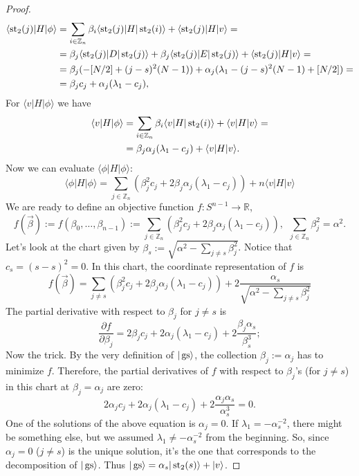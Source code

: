 \begin{proof}
\[\begin{split}
\langle \st_2(j) |H|\phi\rangle& = \sum_{i \in \mathbb Z_n}\beta_i\langle \st_2(j) |H|\st_2(i)\rangle + \langle \st_2(j) | H | v \rangle = \\& = \beta_j \langle \st_2(j) | D|\st_2(j)\rangle + \beta_j \langle \st_2(j)|E|\st_2(j)\rangle + \langle \st_2(j) |H|v \rangle = \\ &= \beta_j(-[N/2] + (j-s)^2(N-1)) +  \alpha_j(\lambda_1 - (j-s)^2(N-1) + [N/2]) = \\ &= \beta_jc_j + \alpha_j(\lambda_1-c_j), %
\end{split}
\]
For $\langle v | H |\phi \rangle$ we have
\[\begin{split}
\langle v | H | \phi \rangle& = \sum_{i \in \mathbb Z_n}\beta_i\langle v | H|\operatorname{st}_2(i)\rangle + \langle v |H|v \rangle = \\ &= \beta_j\alpha_j(\lambda_1 - c_j) + \langle v |H|v \rangle.
\end{split}
\]
Now we can evaluate $\langle \phi | H| \phi \rangle$:
\[
\langle \phi | H| \phi \rangle = \sum_{j \in \mathbb Z_n} \left(\beta_j^2 c_j + 2\beta_j\alpha_j(\lambda_1-c_j) \right) + n\langle v |H|v \rangle 
\]
We are ready to define an objective function $f: S^{n-1} \rightarrow \mathbb R$,
\[
f(\vec{\beta}) := f(\beta_0,\ldots,\beta_{n-1}) := \sum_{j \in \mathbb Z_n} (\beta_j^2 c_j + 2\beta_j\alpha_j(\lambda_1-c_j))
, \ \ \sum_{j\in \mathbb Z_n} \beta_j^2 = \alpha^2.
\]
Let's look at the chart given by $\beta_s := \sqrt{\alpha^2 - \sum_{j \neq s} \beta_j^2}$. Notice that $c_s = (s-s)^2 = 0$. In this chart, the coordinate representation of $f$ is 
\[
f(\vec{\beta}) = \sum_{j\neq s} (\beta_j^2 c_j + 2\beta_j \alpha_j(\lambda_1 - c_j)) + 2\frac{\alpha_s}{\sqrt{\alpha^2 - \sum_{j \neq s} \beta_j^2}}
\]
The partial derivative with respect to $\beta_j$ for $j \neq s$ is
\[
\frac{\partial f}{\partial \beta_j} = 2\beta_j c_j + 2\alpha_j(\lambda_1-c_j) + 2\frac{\beta_j\alpha_s}{\beta_s^3};
\]
Now the trick. By the very definition of $|\operatorname{gs}\rangle$, the collection $\beta_j := \alpha_j$ has to minimize $f$. Therefore, the partial derivatives of $f$ with respect to $\beta_j$'s (for $j \neq s$) in this chart at $\beta_j = \alpha_j$ are zero:
\[
2\alpha_j c_j + 2\alpha_j(\lambda_1-c_j) + 2\frac{\alpha_j\alpha_s}{\alpha_s^3} = 0.
\]
One of the solutions of the above equation is $\alpha_j = 0$. If $\lambda_1 = - \alpha_s^{-2}$, there might be something else, but we assumed $\lambda_1 \neq - \alpha_s^{-2}$ from the beginning. So, since $\alpha_j = 0$ ($j \neq s$) is the unique solution, it's the one that corresponds to the decomposition of $|\operatorname{gs} \rangle$. Thus $|\operatorname{gs}\rangle = \alpha_s |\operatorname{st}_2(s)\rangle + |v\rangle$.
\end{proof}

